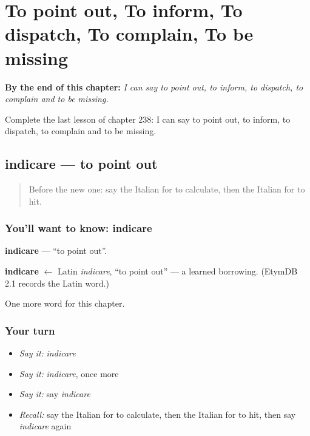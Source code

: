 
\chapter{To point out, To inform, To dispatch, To complain, To be missing}
\label{ch:it-to-point-out-to-inform-to-dispatch-to-complain-to-be-missing}

\begin{chapteropening}
\textbf{By the end of this chapter:} \emph{I can say to point out, to inform, to dispatch, to complain and to be missing.}

Complete the last lesson of chapter 238: I can say to point out, to inform, to dispatch, to complain and to be missing.
\end{chapteropening}

\section[indicare]{indicare — to point out}

\label{lesson:IT-C238-indicare}



\begin{quote}
Before the new one: say the Italian for to calculate, then the Italian for to hit.
\end{quote}

\subsection*{You'll want to know: indicare}
\textbf{indicare} — \textquotedblleft{}to point out\textquotedblright{}.

\begin{cousinweb}
\textbf{indicare} $\leftarrow$ Latin \emph{indicare}, \textquotedblleft{}to point out\textquotedblright{} — a learned borrowing. (EtymDB 2.1 records the Latin word.)
\end{cousinweb}

\begin{grammarlens}[title={What you've built}]
One more word for this chapter.
\end{grammarlens}

\subsection*{Your turn}
\begin{itemize}
\raggedright
  \item \emph{Say it:} \emph{indicare}
  \item \emph{Say it:} \emph{indicare}, once more
  \item \emph{Say it:} say \emph{indicare}
  \item \emph{Recall:} say the Italian for to calculate, then the Italian for to hit, then say \emph{indicare} again
\end{itemize}

